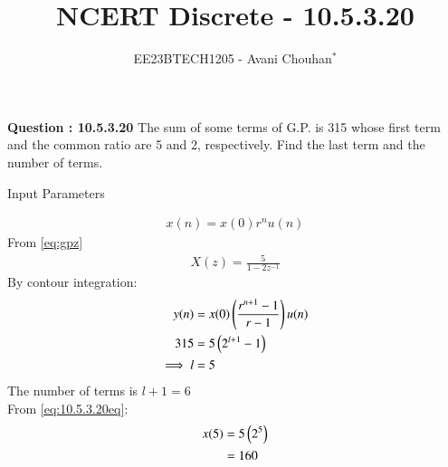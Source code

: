 \documentclass[journal,12pt,twocolumn]{IEEEtran}
\theoremstyle{remark}
\begin{document}

\vspace{3cm}

\title{NCERT Discrete - 10.5.3.20}
\author{EE23BTECH1205 - Avani Chouhan$^{*}$%
}
\maketitle
\newpage
\bigskip

\renewcommand{\thefigure}{\theenumi}
\renewcommand{\thetable}{\theenumi}

\vspace{3cm}
\textbf{Question : 10.5.3.20} 
The sum of some terms of G.P. is 315 whose first term and the common ratio are 5 and 2, respectively. Find the last term and the number of terms.\\
\solution

\begin{table}
  \centering
  
  
  \caption{Input Parameters}
  \label{tab:10.5.3.20table1}
\end{table}
\begin{align}
x(n) = x(0)r^{n}u(n)
\label{eq:10.5.3.20eq}
\end{align}
From \eqref{eq:gpz}
\begin{align}
X(z) =\frac{5}{1-2z^{-1}}
\end{align}
By contour integration:
\begin{align}
y(n) &= x(0)\left(\frac{r^{n+1}-1}{r-1}\right)u(n)\\
315 &= 5\left(2^{l+1}- 1\right)  \\
\implies l &= 5
\end{align}
The number of terms is \(l + 1 = 6\)\\
From \eqref{eq:10.5.3.20eq}:
\begin{align}
x(5) &= 5\left(2^{5}\right)\\
 &= 160 
\end{align}
\end{document}
